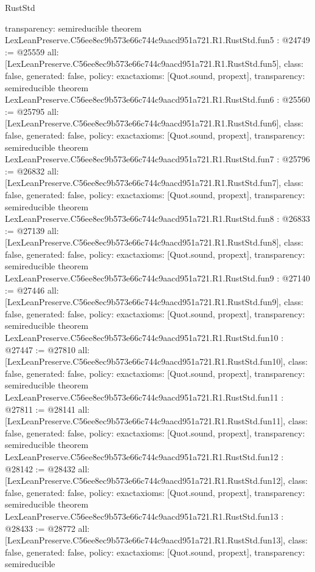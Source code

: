 \begin{lexlean}{RustStd}
\begin{coremodule}
{  transparency: semireducible
}
theorem LexLeanPreserve.C56ee8ec9b573e66c744c9aacd951a721.R1.RustStd.fun5 : @24749 := @25559 {
  all: [LexLeanPreserve.C56ee8ec9b573e66c744c9aacd951a721.R1.RustStd.fun5],
  class: false,
  generated: false,
  policy: exact{axioms: [Quot.sound, propext]},
  transparency: semireducible
}
theorem LexLeanPreserve.C56ee8ec9b573e66c744c9aacd951a721.R1.RustStd.fun6 : @25560 := @25795 {
  all: [LexLeanPreserve.C56ee8ec9b573e66c744c9aacd951a721.R1.RustStd.fun6],
  class: false,
  generated: false,
  policy: exact{axioms: [Quot.sound, propext]},
  transparency: semireducible
}
theorem LexLeanPreserve.C56ee8ec9b573e66c744c9aacd951a721.R1.RustStd.fun7 : @25796 := @26832 {
  all: [LexLeanPreserve.C56ee8ec9b573e66c744c9aacd951a721.R1.RustStd.fun7],
  class: false,
  generated: false,
  policy: exact{axioms: [Quot.sound, propext]},
  transparency: semireducible
}
theorem LexLeanPreserve.C56ee8ec9b573e66c744c9aacd951a721.R1.RustStd.fun8 : @26833 := @27139 {
  all: [LexLeanPreserve.C56ee8ec9b573e66c744c9aacd951a721.R1.RustStd.fun8],
  class: false,
  generated: false,
  policy: exact{axioms: [Quot.sound, propext]},
  transparency: semireducible
}
theorem LexLeanPreserve.C56ee8ec9b573e66c744c9aacd951a721.R1.RustStd.fun9 : @27140 := @27446 {
  all: [LexLeanPreserve.C56ee8ec9b573e66c744c9aacd951a721.R1.RustStd.fun9],
  class: false,
  generated: false,
  policy: exact{axioms: [Quot.sound, propext]},
  transparency: semireducible
}
theorem LexLeanPreserve.C56ee8ec9b573e66c744c9aacd951a721.R1.RustStd.fun10 : @27447 := @27810 {
  all: [LexLeanPreserve.C56ee8ec9b573e66c744c9aacd951a721.R1.RustStd.fun10],
  class: false,
  generated: false,
  policy: exact{axioms: [Quot.sound, propext]},
  transparency: semireducible
}
theorem LexLeanPreserve.C56ee8ec9b573e66c744c9aacd951a721.R1.RustStd.fun11 : @27811 := @28141 {
  all: [LexLeanPreserve.C56ee8ec9b573e66c744c9aacd951a721.R1.RustStd.fun11],
  class: false,
  generated: false,
  policy: exact{axioms: [Quot.sound, propext]},
  transparency: semireducible
}
theorem LexLeanPreserve.C56ee8ec9b573e66c744c9aacd951a721.R1.RustStd.fun12 : @28142 := @28432 {
  all: [LexLeanPreserve.C56ee8ec9b573e66c744c9aacd951a721.R1.RustStd.fun12],
  class: false,
  generated: false,
  policy: exact{axioms: [Quot.sound, propext]},
  transparency: semireducible
}
theorem LexLeanPreserve.C56ee8ec9b573e66c744c9aacd951a721.R1.RustStd.fun13 : @28433 := @28772 {
  all: [LexLeanPreserve.C56ee8ec9b573e66c744c9aacd951a721.R1.RustStd.fun13],
  class: false,
  generated: false,
  policy: exact{axioms: [Quot.sound, propext]},
  transparency: semireducible
}
\end{coremodule}
\end{lexlean}
